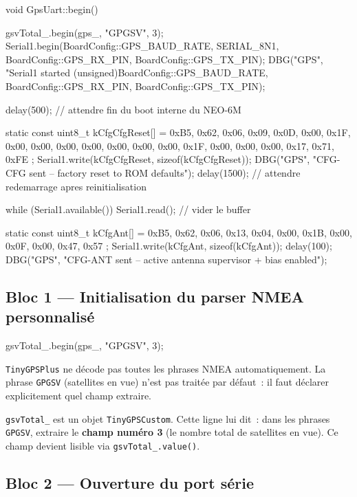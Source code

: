 \documentclass[12pt,a4paper]{article}
\newcommand{\code}[1]{\texttt{#1}}
\begin{document}
\begin{cppbox}
void GpsUart::begin() {
    gsvTotal_.begin(gps_, "GPGSV", 3);
    Serial1.begin(BoardConfig::GPS_BAUD_RATE, SERIAL_8N1,
                  BoardConfig::GPS_RX_PIN, BoardConfig::GPS_TX_PIN);
    DBG("GPS", "Serial1 started %
        (unsigned)BoardConfig::GPS_BAUD_RATE,
        BoardConfig::GPS_RX_PIN, BoardConfig::GPS_TX_PIN);

    delay(500);   // attendre fin du boot interne du NEO-6M

    static const uint8_t kCfgCfgReset[] = {
        0xB5, 0x62, 0x06, 0x09, 0x0D, 0x00,
        0x1F, 0x00, 0x00, 0x00,
        0x00, 0x00, 0x00, 0x00,
        0x1F, 0x00, 0x00, 0x00,
        0x17,
        0x71, 0xFE
    };
    Serial1.write(kCfgCfgReset, sizeof(kCfgCfgReset));
    DBG("GPS", "CFG-CFG sent -- factory reset to ROM defaults");
    delay(1500);  // attendre redemarrage apres reinitialisation

    while (Serial1.available()) Serial1.read();  // vider le buffer

    static const uint8_t kCfgAnt[] = {
        0xB5, 0x62, 0x06, 0x13, 0x04, 0x00,
        0x1B, 0x00,
        0x0F, 0x00,
        0x47, 0x57
    };
    Serial1.write(kCfgAnt, sizeof(kCfgAnt));
    delay(100);
    DBG("GPS", "CFG-ANT sent -- active antenna supervisor + bias enabled");
}
\end{cppbox}

\subsection{Bloc 1 --- Initialisation du parser NMEA personnalis\'e}

\begin{cppbox}
gsvTotal_.begin(gps_, "GPGSV", 3);
\end{cppbox}

\code{TinyGPSPlus} ne d\'ecode pas toutes les phrases NMEA automatiquement.
La phrase \code{GPGSV} (satellites en vue) n'est pas trait\'ee par d\'efaut~:
il faut d\'eclarer explicitement quel champ extraire.

\code{gsvTotal\_} est un objet \code{TinyGPSCustom}. Cette ligne lui dit~:
dans les phrases \code{GPGSV}, extraire le \textbf{champ num\'ero 3} (le
nombre total de satellites en vue). Ce champ devient lisible via
\code{gsvTotal\_.value()}.

\subsection{Bloc 2 --- Ouverture du port s\'erie}
\end{document}
